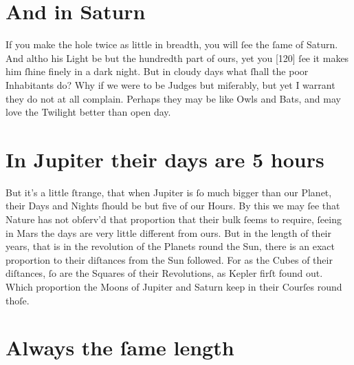 \documentclass[letterpaper]{book}
\begin{document}
\section{And in Saturn}

If you make the hole twice as little in breadth, you will ſee the ſame of
Saturn. And altho his Light be but the hundredth part of ours, yet you
[120] ſee it makes him ſhine finely in a dark night. But in cloudy days what
ſhall the poor Inhabitants do? Why if we were to be Judges but miſerably,
but yet I warrant they do not at all complain. Perhaps they may be like
Owls and Bats, and may love the Twilight better than open day.


\section{In Jupiter their days are 5 hours}

But it's a little ſtrange, that when Jupiter is ſo much bigger than our
Planet, their Days and Nights ſhould be but five of our Hours. By this we
may ſee that Nature has not obſerv'd that proportion that their bulk ſeems
to require, ſeeing in Mars the days are very little different from ours. But
in the length of their years, that is in the revolution of the Planets round
the Sun, there is an exact proportion to their diſtances from the Sun
followed. For as the Cubes of their diſtances, ſo are the Squares of their
Revolutions, as Kepler firſt found out. Which proportion the Moons of
Jupiter and Saturn keep in their Courſes round thoſe.


\section{Always the ſame length}
\end{document}
